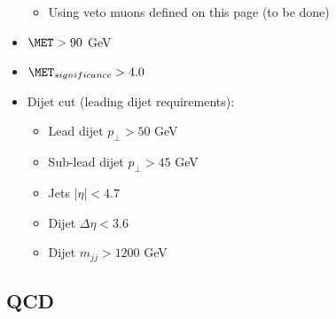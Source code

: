 \begin{itemize}
  \begin{itemize}
    \item Using veto muons defined on this page (to be done)
  \end{itemize}
  \item $\MET > 90 $ GeV
  \item $\MET_{significance} > 4.0 $
  \item Dijet cut (leading dijet requirements):
  \begin{itemize}
    \item Lead dijet $ p_{\perp} > 50$ GeV
    \item Sub-lead dijet $ p_{\perp} > 45$ GeV
    \item Jets $ |\eta| < 4.7 $
    \item Dijet $ \Delta\eta < 3.6 $
    \item Dijet $ m_{jj} > 1200 $ GeV
  \end{itemize}
\end{itemize}
    



\subsection{QCD}



